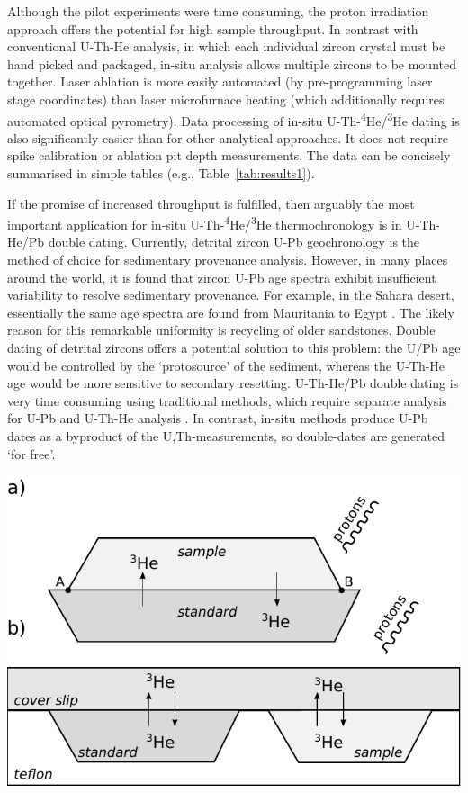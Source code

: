 \documentclass{article}
\begin{document}
Although the pilot experiments were time consuming, the proton
irradiation approach offers the potential for high sample throughput.
In contrast with conventional U-Th-He analysis, in which each
individual zircon crystal must be hand picked and packaged, in-situ
analysis allows multiple zircons to be mounted together. Laser
ablation is more easily automated (by pre-programming laser stage
coordinates) than laser microfurnace heating (which additionally
requires automated optical pyrometry). Data processing of in-situ
U-Th-\textsuperscript{4}He/\textsuperscript{3}He dating is also
significantly easier than for other analytical approaches. It does not
require spike calibration or ablation pit depth measurements. The data
can be concisely summarised in simple tables (e.g.,
Table~\ref{tab:results1}).\medskip

If the promise of increased throughput is fulfilled, then arguably the
most important application for in-situ
U-Th-\textsuperscript{4}He/\textsuperscript{3}He thermochronology is
in U-Th-He/Pb double dating. Currently, detrital zircon U-Pb
geochronology is the method of choice for sedimentary provenance
analysis. However, in many places around the world, it is found that
zircon U-Pb age spectra exhibit insufficient variability to resolve
sedimentary provenance. For example, in the Sahara desert, essentially
the same age spectra are found from Mauritania to Egypt
\citep{pastore2021}. The likely reason for this remarkable uniformity
is recycling of older sandstones.  Double dating of detrital zircons
offers a potential solution to this problem: the U/Pb age would be
controlled by the `protosource' of the sediment, whereas the U-Th-He
age would be more sensitive to secondary resetting. U-Th-He/Pb double
dating is very time consuming using traditional methods, which require
separate analysis for U-Pb and U-Th-He analysis
\citep{reiners2005}. In contrast, in-situ methods produce U-Pb dates
as a byproduct of the U,Th-measurements, so double-dates are generated
`for free'.

\includegraphics[width=.4\textwidth]{pairing.pdf}
\label{fig:pairing}
\end{document}
